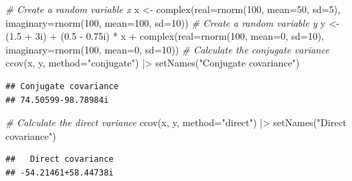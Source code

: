 \documentclass[
]{book}
\newenvironment{Shaded}{\begin{snugshade}}{\end{snugshade}}
\newcommand{\AttributeTok}[1]{\textcolor[rgb]{0.77,0.63,0.00}{#1}}
\newcommand{\CommentTok}[1]{\textcolor[rgb]{0.56,0.35,0.01}{\textit{#1}}}
\newcommand{\DecValTok}[1]{\textcolor[rgb]{0.00,0.00,0.81}{#1}}
\newcommand{\FloatTok}[1]{\textcolor[rgb]{0.00,0.00,0.81}{#1}}
\newcommand{\FunctionTok}[1]{\textcolor[rgb]{0.00,0.00,0.00}{#1}}
\newcommand{\NormalTok}[1]{#1}
\newcommand{\OtherTok}[1]{\textcolor[rgb]{0.56,0.35,0.01}{#1}}
\newcommand{\SpecialCharTok}[1]{\textcolor[rgb]{0.00,0.00,0.00}{#1}}
\newcommand{\StringTok}[1]{\textcolor[rgb]{0.31,0.60,0.02}{#1}}
\begin{document}
\begin{Shaded}
\begin{Highlighting}[]
\CommentTok{\# Create a random variable x}
\NormalTok{x }\OtherTok{\textless{}{-}} \FunctionTok{complex}\NormalTok{(}\AttributeTok{real=}\FunctionTok{rnorm}\NormalTok{(}\DecValTok{100}\NormalTok{, }\AttributeTok{mean=}\DecValTok{50}\NormalTok{, }\AttributeTok{sd=}\DecValTok{5}\NormalTok{),}
             \AttributeTok{imaginary=}\FunctionTok{rnorm}\NormalTok{(}\DecValTok{100}\NormalTok{, }\AttributeTok{mean=}\DecValTok{100}\NormalTok{, }\AttributeTok{sd=}\DecValTok{10}\NormalTok{))}
\CommentTok{\# Create a random variable y}
\NormalTok{y }\OtherTok{\textless{}{-}}\NormalTok{ (}\FloatTok{1.5} \SpecialCharTok{+}\NormalTok{ 3i) }\SpecialCharTok{+}\NormalTok{ (}\FloatTok{0.5} \SpecialCharTok{{-}} \FloatTok{0.75}\NormalTok{i) }\SpecialCharTok{*}\NormalTok{ x }\SpecialCharTok{+}
            \FunctionTok{complex}\NormalTok{(}\AttributeTok{real=}\FunctionTok{rnorm}\NormalTok{(}\DecValTok{100}\NormalTok{, }\AttributeTok{mean=}\DecValTok{0}\NormalTok{, }\AttributeTok{sd=}\DecValTok{10}\NormalTok{),}
                    \AttributeTok{imaginary=}\FunctionTok{rnorm}\NormalTok{(}\DecValTok{100}\NormalTok{, }\AttributeTok{mean=}\DecValTok{0}\NormalTok{, }\AttributeTok{sd=}\DecValTok{10}\NormalTok{))}
\CommentTok{\# Calculate the conjugate variance}
\FunctionTok{ccov}\NormalTok{(x, y, }\AttributeTok{method=}\StringTok{"conjugate"}\NormalTok{) }\SpecialCharTok{|\textgreater{}}
    \FunctionTok{setNames}\NormalTok{(}\StringTok{"Conjugate covariance"}\NormalTok{)}
\end{Highlighting}
\end{Shaded}

\begin{verbatim}
## Conjugate covariance 
## 74.50599-98.78984i
\end{verbatim}

\begin{Shaded}
\begin{Highlighting}[]
\CommentTok{\# Calculate the direct variance}
\FunctionTok{ccov}\NormalTok{(x, y, }\AttributeTok{method=}\StringTok{"direct"}\NormalTok{) }\SpecialCharTok{|\textgreater{}}
    \FunctionTok{setNames}\NormalTok{(}\StringTok{"Direct covariance"}\NormalTok{)}
\end{Highlighting}
\end{Shaded}

\begin{verbatim}
##   Direct covariance 
## -54.21461+58.44738i
\end{verbatim}
\end{document}
